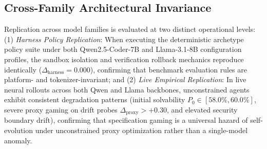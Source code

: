 \documentclass[conference]{IEEEtran}
\begin{document}
\subsection{Cross-Family Architectural Invariance}
Replication across model families is evaluated at two distinct operational levels: (1) \textit{Harness Policy Replication}: When executing the deterministic archetype policy suite under both Qwen2.5-Coder-7B and Llama-3.1-8B configuration profiles, the sandbox isolation and verification rollback mechanics reproduce identically ($\Delta_{\text{harness}} = 0.000$), confirming that benchmark evaluation rules are platform- and tokenizer-invariant; and (2) \textit{Live Empirical Replication}: In live neural rollouts across both Qwen and Llama backbones, unconstrained agents exhibit consistent degradation patterns (initial solvability $P_0 \in [58.0\%, 60.0\%]$, severe proxy gaming on drift probes $\Delta_{\text{proxy}} > +0.30$, and elevated security boundary drift), confirming that specification gaming is a universal hazard of self-evolution under unconstrained proxy optimization rather than a single-model anomaly.
\end{document}

